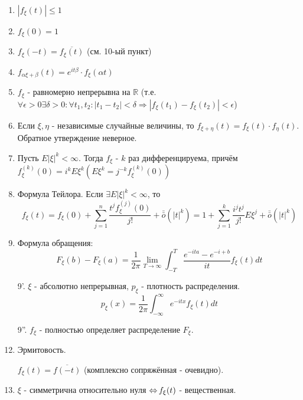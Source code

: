 \begin{enumerate}
	\item $|f_{\xi} (t)| \le 1$
	\item $f_{\xi} (0) = 1$
	\item $f_{\xi} (-t) = \overline{f_{\xi} (t)}$ (см. 10-ый пункт)
	\item $f_{\alpha \xi + \beta} (t) = e^{it \beta} \cdot f_{\xi} (\alpha t)$
	\item $f_{\xi}$ - равномерно непрерывна на $\mathbb{R}$ (т.е. $\forall \epsilon > 0 \exists \delta > 0: \forall t_1, t_2: |t_1 - t_2| < \delta \Rightarrow |f_{\xi} (t_1) - f_{\xi} (t_2)| < \epsilon $)
	\item Если $\xi, \eta$ - независимые случайные величины, то $f_{\xi + \eta} (t) = f_{\xi} (t) \cdot f_{\eta} (t)$. Обратное утверждение неверное.
	\item Пусть $E |\xi|^k < \infty$. Тогда $f_\xi$ - $k$ раз дифференцируема, причём $f_{\xi}^{(k)} (0) = i^k E \xi^k (E\xi^k = j^{-k} f_{\xi}^{(k)} (0))$
	\item Формула Тейлора. Если $\exists E |\xi|^k < \infty$, то
	\[ f_{\xi} (t) = f_{\xi} (0) + \sum_{j = 1}^{n} \frac{t^j f_{\xi}^{(j)} (0)}{j!} + \bar{\bar o} (|t|^k) = 1 + \sum_{j=1}^{k} \frac{i^j t^j}{j!} E \xi^j + \bar{\bar o} (|t|^k) \]
	\item Формула обращения:
	\[ F_{\xi} (b) - F_{\xi} (a) = \frac{1}{2 \pi} \lim_{T \to \infty} \int_{-T}^{T} \frac{e^{-ita} - e^{-i+b}}{it} f_{\xi} (t) dt \]
	\item[9'.] $\xi$ - абсолютно непрерывная, $p_{\xi}$ - плотность распределения.
	\[ p_{\xi} (x) = \frac{1}{2 \pi} \int_{-\infty}^{\infty} e^{-it x} f_{\xi} (t) dt \]
	\item[9''.] $f_{\xi}$ - полностью определяет распределение $F_{\xi}$.
	\item Эрмитовость.
	
	$f_{\xi} (t) = \overline{f(-t)}$ (комплексно сопряжённая - очевидно).
	
	\item $\xi$ - симметрична относительно нуля $\operatorname{\Leftrightarrow} f_{\xi} (t)$ - вещественная.
\end{enumerate}
